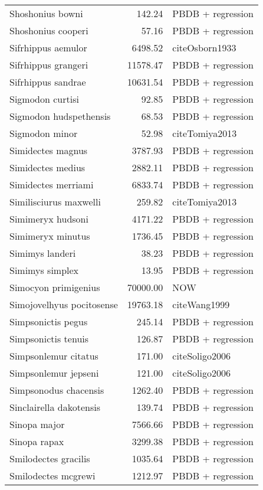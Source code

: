 \begin{table}[ht]
\begin{tabular}{lrl}
  Shoshonius bowni & 142.24 & PBDB + regression \\ 
  Shoshonius cooperi & 57.16 & PBDB + regression \\ 
  Sifrhippus aemulor & 6498.52 & cite{Osborn1933} \\ 
  Sifrhippus grangeri & 11578.47 & PBDB + regression \\ 
  Sifrhippus sandrae & 10631.54 & PBDB + regression \\ 
  Sigmodon curtisi & 92.85 & PBDB + regression \\ 
  Sigmodon hudspethensis & 68.53 & PBDB + regression \\ 
  Sigmodon minor & 52.98 & cite{Tomiya2013} \\ 
  Simidectes magnus & 3787.93 & PBDB + regression \\ 
  Simidectes medius & 2882.11 & PBDB + regression \\ 
  Simidectes merriami & 6833.74 & PBDB + regression \\ 
  Similisciurus maxwelli & 259.82 & cite{Tomiya2013} \\ 
  Simimeryx hudsoni & 4171.22 & PBDB + regression \\ 
  Simimeryx minutus & 1736.45 & PBDB + regression \\ 
  Simimys landeri & 38.23 & PBDB + regression \\ 
  Simimys simplex & 13.95 & PBDB + regression \\ 
  Simocyon primigenius & 70000.00 & NOW \\ 
  Simojovelhyus pocitosense & 19763.18 & cite{Wang1999} \\ 
  Simpsonictis pegus & 245.14 & PBDB + regression \\ 
  Simpsonictis tenuis & 126.87 & PBDB + regression \\ 
  Simpsonlemur citatus & 171.00 & cite{Soligo2006} \\ 
  Simpsonlemur jepseni & 121.00 & cite{Soligo2006} \\ 
  Simpsonodus chacensis & 1262.40 & PBDB + regression \\ 
  Sinclairella dakotensis & 139.74 & PBDB + regression \\ 
  Sinopa major & 7566.66 & PBDB + regression \\ 
  Sinopa rapax & 3299.38 & PBDB + regression \\ 
  Smilodectes gracilis & 1035.64 & PBDB + regression \\ 
  Smilodectes mcgrewi & 1212.97 & PBDB + regression \\ 

\end{tabular}
\end{table}
